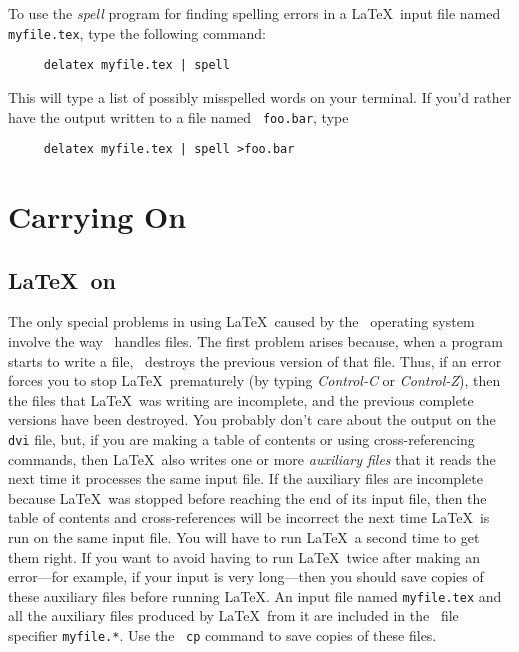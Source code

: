 To use the {\em spell\/} program for finding spelling errors in a
\LaTeX\ input file named \mbox{\tt myfile.tex}, type the following
command:
\begin{verbatim}
     delatex myfile.tex | spell
\end{verbatim}
This will type a list of possibly misspelled words on your terminal.
If you'd rather have the output written to a file named \mbox{\tt
foo.bar}, type
\begin{verbatim}
     delatex myfile.tex | spell >foo.bar
\end{verbatim}


\section{Carrying On}

\subsection{\LaTeX\ on \UNIX } \label{sec:op-system}

The only special problems in using \LaTeX\ caused by the \UNIX\
operating system involve the way \UNIX\ handles files.  The first
problem arises because, when a program starts to write a file, \UNIX\
destroys the previous version of that file.  Thus, if an error forces
you to stop \LaTeX\ prematurely (by typing {\em Control-C\/} or {\em
Control-Z\/}), then the files that \LaTeX\ was writing are incomplete,
and the previous complete versions have been destroyed.  You probably
don't care about the output on the {\tt dvi} file, but, if you are
making a table of contents or using cross-referencing commands, then
\LaTeX\ also writes one or more {\em auxiliary files\/} that it reads
the next time it processes the same input file.  If the auxiliary files
are incomplete because \LaTeX\ was stopped before reaching the end of
its input file, then the table of contents and cross-references will be
incorrect the next time \LaTeX\ is run on the same input file.  You
will have to run \LaTeX\ a second time to get them right.  If you want
to avoid having to run \LaTeX\ twice after making an error---for
example, if your input is very long---then you should save copies of
these auxiliary files before running \LaTeX. An input file named
\mbox{\tt myfile.tex} and all the auxiliary files produced by \LaTeX\
from it are included in the \UNIX\ file specifier \mbox{\tt myfile.*}.
Use the \UNIX\ {\tt cp} command to save copies of these files.

